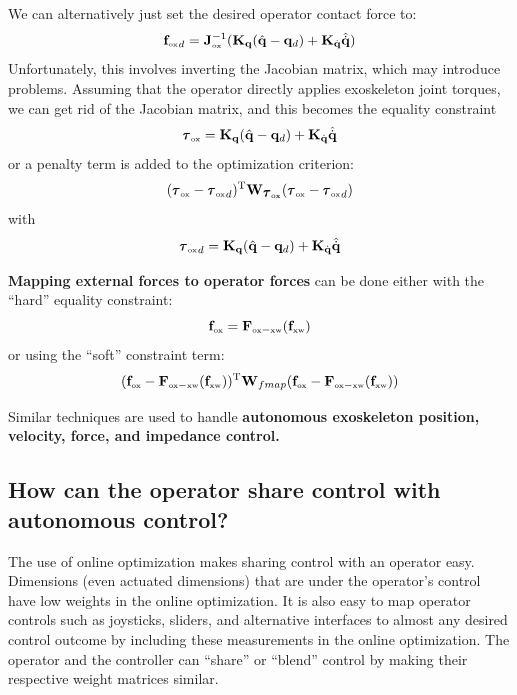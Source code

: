 \documentclass[letterpaper,12pt,fullpage]{article}
\newcommand{\ox}{{\mbox {\tiny ox}}}
\newcommand{\xw}{{\mbox {\tiny xw}}}
\begin{document}
We can alternatively just set the desired operator contact force to:
\begin{equation}
{\vf_{\ox}}_d = \mJ_{\ox}^{-1} ( \mK_{\vq}( \hat{\vq} - \vq_d ) + \mK_{\dot{\vq}} \hat{\dot{\vq}} )
\end{equation}
Unfortunately, this involves inverting the Jacobian matrix, which may introduce
problems.
Assuming that the operator directly applies exoskeleton joint torques, 
we can get rid of the Jacobian matrix, and this becomes
the equality constraint
\begin{equation}
\vtau_{\ox} = \mK_{\vq}( \hat{\vq} - \vq_d ) + \mK_{\dot{\vq}} \hat{\dot{\vq}}
\end{equation}
or a penalty term is added to the optimization criterion:
\begin{equation}
(\vtau_{\ox} - {\vtau_{\ox}}_d)^{\tr} \mW_{\vtau_{\ox}} (\vtau_{\ox} - {\vtau_{\ox}}_d)
\end{equation}
with
\begin{equation}
{\vtau_{\ox}}_d = \mK_{\vq}( \hat{\vq} - \vq_d ) + \mK_{\dot{\vq}} \hat{\dot{\vq}}
\end{equation}

{\bf Mapping external forces to operator forces} can be done either with the
``hard'' equality constraint:
\begin{equation}
\vf_{\ox} = \mF_{\ox-\xw} ( \vf_{\xw} )
\end{equation}
or using the ``soft'' constraint term:
\begin{equation}
(\vf_{\ox} - \mF_{\ox-\xw} ( \vf_{\xw} ))^\tr \mW_{fmap} (\vf_{\ox} - \mF_{\ox-\xw} ( \vf_{\xw} ))
\end{equation}

Similar techniques are used to handle {\bf autonomous exoskeleton position, velocity,
force, and impedance control.}

\subsection{How can the operator share control with autonomous control?}

The use of online optimization makes sharing control with an operator easy.
Dimensions (even actuated dimensions) that are under the operator's control have
low weights in the online optimization. It is also easy to map operator controls
such as joysticks, sliders, and alternative interfaces to almost any desired
control outcome by including these measurements in the online optimization.
The operator and the controller can ``share'' or ``blend''
control by making their respective
weight matrices similar.
\end{document}
